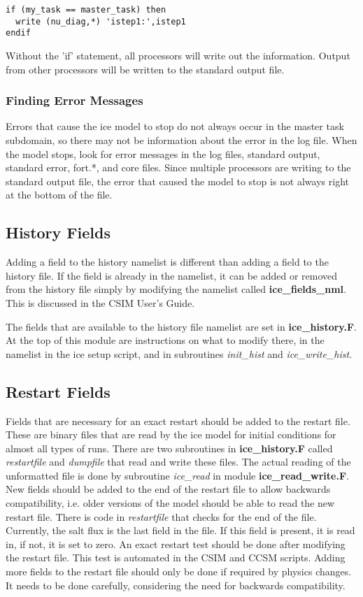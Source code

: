 \begin{verbatim}
if (my_task == master_task) then
  write (nu_diag,*) 'istep1:',istep1
endif
\end{verbatim}

Without the 'if' statement, all processors will write out the information.
Output from other processors will be written to the standard output file.

\subsubsection*{Finding Error Messages}

Errors that cause the ice model to stop do not always occur in the master task
subdomain, so there may not be information about the error in the log file.
When the model stops, look for error messages in the log files, standard output,
standard error, fort.*, and core files.  Since multiple processors are writing to
the standard output file, the error that caused the model to stop is not always right
at the bottom of the file.

\subsection {History Fields}

Adding a field to the history namelist is different than adding a field to
the history file.  If the field is already in the namelist, it can be added
or removed from the history file simply by modifying the namelist called
{\bf ice\_fields\_nml}. This is discussed in the CSIM User's Guide.

The fields that are available to the history file namelist are set in 
{\bf ice\_history.F}.  At the top of this module are instructions on
what to modify there, in the namelist in the ice setup script, and in
subroutines {\it init\_hist} and {\it ice\_write\_hist}.


\subsection {Restart Fields}

Fields that are necessary for an exact restart should be added to the
restart file.  These are binary files that are read by the ice model
for initial conditions for almost all types of runs.   There are
two subroutines in {\bf ice\_history.F} called {\it restartfile} and
{\it dumpfile} that read and write these files.  The actual reading of
the unformatted file is done by subroutine {\it ice\_read} in module
{\bf ice\_read\_write.F}.  New fields should be added to the end of the
restart file to allow backwards compatibility, i.e. older versions of
the model should be able to read the new restart file.  There is code in
{\it restartfile} that checks for the end of the file.  Currently, the
salt flux is the last field in the file.  If this field is present, it
is read in, if not, it is set to zero.  An exact restart test should be
done after modifying the restart file.  This test is automated in the
CSIM and CCSM scripts.  Adding more fields to the restart file should
only be done if required by physics changes.  It needs to be done
carefully, considering the need for backwards compatibility.
